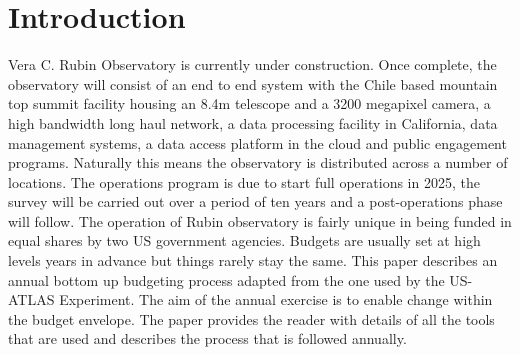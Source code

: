 \section{Introduction} \label{sec:intro}
Vera C. Rubin Observatory\cite{2008arXiv0805.2366I} is currently under construction. Once complete, the observatory will consist of an end to end system  with the Chile based mountain top summit facility housing an 8.4m telescope and a 3200 megapixel camera, a high bandwidth long haul network, a data processing facility in California, data management systems, a data access platform in the cloud and public engagement programs. Naturally this means the observatory is distributed across a number of locations. The operations program is due to start full operations in 2025, the survey will be carried out over a period of ten years and a post-operations phase will follow. The operation of Rubin observatory is fairly unique in being funded in equal shares by two US government agencies. Budgets are usually set at high levels years in advance but things rarely stay the same. This paper describes an annual bottom up budgeting process adapted from the one used by the US-ATLAS Experiment. The aim of the annual exercise is to enable change within the budget envelope.
The paper provides the reader with details of all the tools that are used and describes the process that is followed annually.
